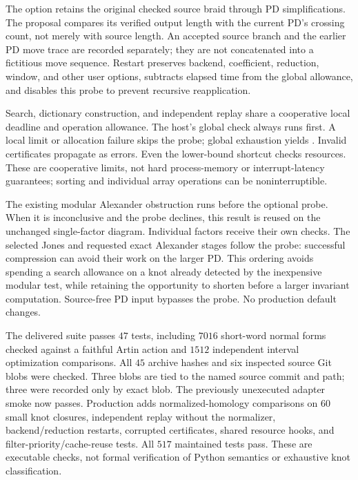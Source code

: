 The  option retains the original checked source braid
through PD simplifications.  The proposal compares its verified output
length with the current PD's crossing count, not merely with source length.
An accepted source branch and the earlier PD move trace are recorded
separately; they are not concatenated into a fictitious move sequence.
Restart preserves backend, coefficient, reduction, window, and other user
options, subtracts elapsed time from the global allowance, and disables
this probe to prevent recursive reapplication.

Search, dictionary construction, and independent replay share a cooperative
local deadline and operation allowance.  The host's global check always
runs first.  A local limit or allocation failure skips the probe; global
exhaustion yields .  Invalid certificates propagate as errors.
Even the lower-bound shortcut checks resources.  These are cooperative
limits, not hard process-memory or interrupt-latency guarantees; sorting
and individual array operations can be noninterruptible.

The existing modular Alexander obstruction runs before the optional probe.
When it is inconclusive and the probe declines, this result is reused on
the unchanged single-factor diagram.  Individual factors receive their own
checks.  The selected Jones and requested exact Alexander stages follow
the probe: successful compression can avoid their work on the larger PD.
This ordering avoids spending a search allowance on a knot already detected
by the inexpensive modular test, while retaining the opportunity to shorten
before a larger invariant computation.  Source-free PD input bypasses the
probe.  No production default changes.

The delivered suite passes $47$ tests, including $7016$ short-word normal
forms checked against a faithful Artin action and $1512$ independent interval
optimization comparisons.  All $45$ archive hashes and six inspected source
Git blobs were checked.  Three blobs are tied to the named source commit
and path; three were recorded only by exact blob.  The previously unexecuted
adapter smoke now passes.  Production adds normalized-homology comparisons
on $60$ small knot closures, independent replay without the normalizer,
backend/reduction restarts, corrupted certificates, shared resource hooks,
and filter-priority/cache-reuse tests.  All $517$ maintained tests pass.
These are executable checks, not
formal verification of Python semantics or exhaustive knot classification.

